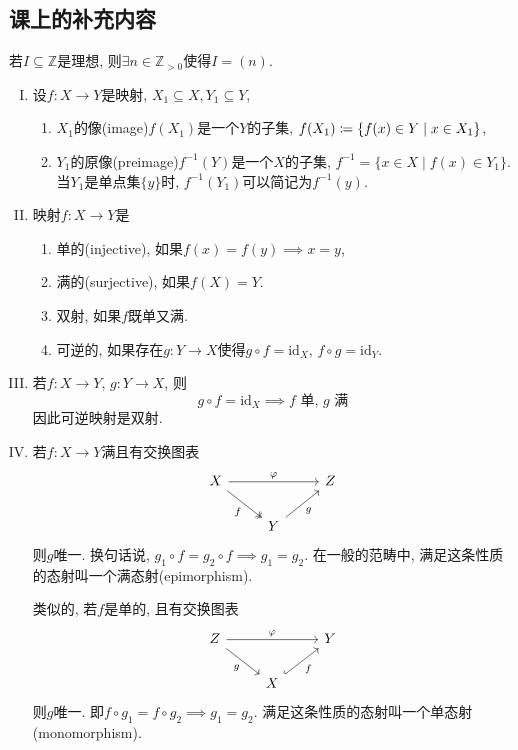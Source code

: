 \documentclass{../solutions-cn}
\begin{document}
\subsection*{课上的补充内容}
\begin{additional}
    若$I \subseteq \mathbb{Z}$是理想, 则$\exists n \in \mathbb{Z}_{>0}$使得$I = (n)$.
\end{additional}

\begin{additional}[集合论相关]
\begin{enumerate}[I.]
    \item 设$f: X \to Y$是映射, $X_1 \subseteq X, Y_1 \subseteq Y$,
    \begin{enumerate}[(1)]
        \item $X_1$的像(image)$f(X_1)$是一个$Y$的子集, $f(X_1) \mathrel{\coloneqq} \{f(x) \in Y \mid x \in X_1\}$,
        \item $Y_1$的原像(preimage)$f^{-1}(Y)$是一个$X$的子集, $f^{-1} = \{x \in X \mid f(x) \in Y_1\}$. 当$Y_1$是单点集$\{y\}$时, $f^{-1}(Y_1)$可以简记为$f^{-1}(y)$.
    \end{enumerate}
    \item 映射$f: X \to Y$是
    \begin{enumerate}[(1)]
        \item 单的(injective), 如果$f(x) = f(y) \implies x = y$,
        \item 满的(surjective), 如果$f(X) = Y$.
        \item 双射, 如果$f$既单又满.
        \item 可逆的, 如果存在$g: Y \to X$使得$g \circ f = \mathrm{id}_X,\, f \circ g = \mathrm{id}_Y$.
    \end{enumerate}
    \item 若$f: X \to Y$, $g: Y \to X$, 则
    \[
        g \circ f = \mathrm{id}_X \implies f \text{ 单},\, g \text{ 满}
    \]
    因此可逆映射是双射.
    \item 若$f: X \to Y$满且有交换图表
    \[
        \begin{tikzcd}
            X \arrow[rr, "\varphi"] \arrow[rd, "f"', two heads] &                    & Z \\
                                                                & Y \arrow[ru, "g"'] &  
            \end{tikzcd}
    \]
    则$g$唯一. 换句话说, $g_1 \circ f = g_2 \circ f \implies g_1 = g_2$. 在一般的范畴中, 满足这条性质的态射叫一个满态射(epimorphism).

    类似的, 若$f$是单的, 且有交换图表
    \[
        \begin{tikzcd}
            Z \arrow[rr, "\varphi"] \arrow[rd, "g"'] &                          & Y \\
                                                     & X \arrow[ru, "f"', hook] &  
            \end{tikzcd}
    \]
    则$g$唯一. 即$f \circ g_1 = f \circ g_2 \implies g_1 = g_2$. 满足这条性质的态射叫一个单态射(monomorphism).
\end{enumerate}
\end{additional}
\end{document}

